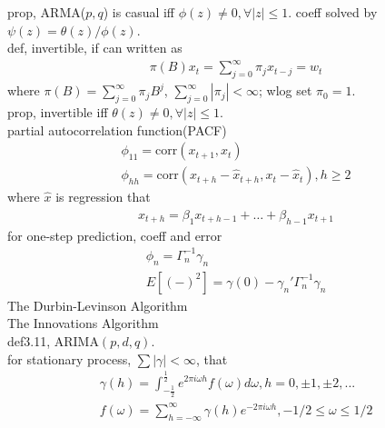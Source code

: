 \documentclass[paper=a4, fontsize=11pt]{scrartcl} %
\numberwithin{equation}{section} %
\numberwithin{figure}{section} %
\numberwithin{table}{section} %
\begin{document}
prop, ARMA($p,q$) is casual iff $\phi(z)\neq 0,\forall|z|\leq 1$. coeff solved by $\psi(z) = \theta(z)/\phi(z)$.\\
def, invertible, if can written as
\begin{align}
	\pi(B)x_t = \sum_{j=0}^\infty \pi_j x_{t-j} = w_t
\end{align}
where $\pi(B)=\sum_{j=0}^\infty\pi_jB^j$, $\sum_{j=0}^\infty |\pi_j|<\infty$; wlog set $\pi_0=1$.\\
prop, invertible iff $\theta(z)\neq 0,\forall |z|\leq 1$.\\
partial autocorrelation function(PACF)
\begin{align}
	\phi_{11}=\text{corr}(x_{t+1}, x_t)\\
	\phi_{hh}=\text{corr}(x_{t+h}-\widehat{x}_{t+h}, x_t - \widehat{x}_t), h\geq 2
\end{align}
where $\widehat{x}$ is regression that
\begin{align}
	\widehat{x}_{t+h} = \beta_1 x_{t+h-1}+\dots +\beta_{h-1}x_{t+1}
\end{align}
for one-step prediction, coeff and error
\begin{align}
	\phi_n = \Gamma_n^{-1}\gamma_n\\
	E[(-)^2] = \gamma(0) - \gamma_n'\Gamma_n^{-1}\gamma_n
\end{align}
The Durbin-Levinson Algorithm\\
The Innovations Algorithm\\
def3.11, ARIMA$(p,d,q)$.\\
for stationary process, $\sum|\gamma|<\infty$, that
\begin{align}
	\gamma(h) = \int_{-\frac{1}{2}}^{\frac{1}{2}} e^{2\pi i \omega h} f(\omega)d\omega, h=0,\pm 1,\pm 2,...\\
	f(\omega) = \sum_{h=-\infty}^\infty \gamma(h)e^{-2\pi i \omega h}, -1/2\leq \omega\leq 1/2
\end{align}
\end{document}
